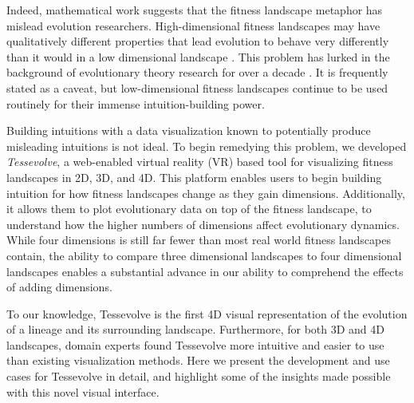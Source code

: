 Indeed, mathematical work suggests that the fitness landscape metaphor has mislead evolution researchers. 
High-dimensional fitness landscapes may have qualitatively different properties that lead evolution to behave very differently than it would in a low dimensional landscape \citep{agarwala_adaptive_2019}. 
This problem has lurked in the background of evolutionary theory research for over a decade \citep{kaplan_end_2008}. 
It is frequently stated as a caveat, but low-dimensional fitness landscapes continue to be used routinely for their immense intuition-building power.

Building intuitions with a data visualization known to potentially produce misleading intuitions is not ideal. 
To begin remedying this problem, we developed \textit{Tessevolve}, a web-enabled virtual reality (VR) based tool for visualizing fitness landscapes in 2D, 3D, and 4D. 
This platform enables users to begin building intuition for how fitness landscapes change as they gain dimensions. 
Additionally, it allows them to plot evolutionary data on top of the fitness landscape, to understand how the higher numbers of dimensions affect evolutionary dynamics. 
While four dimensions is still far fewer than most real world fitness landscapes contain, the ability to compare three dimensional landscapes to four dimensional landscapes enables a substantial advance in our ability to comprehend the effects of adding dimensions.

To our knowledge, Tessevolve is the first 4D visual representation of the evolution of a lineage and its surrounding landscape. 
Furthermore, for both 3D and 4D landscapes, domain experts found Tessevolve more intuitive and easier to use than existing visualization methods. 
Here we present the development and use cases for Tessevolve in detail, and highlight some of the insights made possible with this novel visual interface.